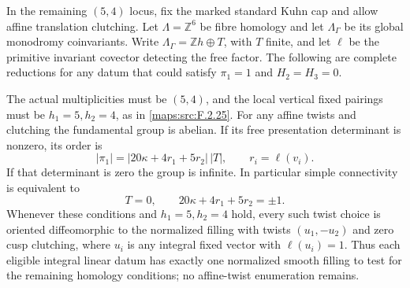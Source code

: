 



\begin{theorem}\label{maps:src:F.2.28}


In the remaining $(5,4)$ locus, fix the marked standard Kuhn
cap and allow affine translation clutching.
Let $\Lambda=\mathbb Z^6$ be fibre homology and let
$\Lambda_\Gamma$ be its global monodromy coinvariants.
Write $\Lambda_\Gamma=\mathbb Zh\oplus T$, with $T$ finite,
and let $\ell$ be the primitive invariant covector detecting
the free factor.  The following are complete reductions for
any datum that could satisfy $\pi_1=1$ and $H_2=H_3=0$.

The actual multiplicities must be $(5,4)$, and the local
vertical fixed pairings must be $h_1=5,h_2=4$, as in \ref{maps:src:F.2.25}.
For any affine twists and clutching the fundamental group
is abelian.  If its free presentation determinant is nonzero,
its order is
\[
 |\pi_1|=|20\kappa+4r_1+5r_2|\,|T|,
 \qquad r_i=\ell(v_i).
 \tag{F.T11}\label{maps:eq:F.T11}
\]
If that determinant is zero the group is infinite.
In particular simple connectivity is equivalent to
\[
 T=0,\qquad 20\kappa+4r_1+5r_2=\pm1.
 \tag{F.T12}\label{maps:eq:F.T12}
\]
Whenever these conditions and $h_1=5,h_2=4$ hold, every
such twist choice is oriented diffeomorphic to the normalized
filling with twists $(u_1,-u_2)$ and zero cusp clutching,
where $u_i$ is any integral fixed vector with $\ell(u_i)=1$.
Thus each eligible integral linear datum has exactly one
normalized smooth filling to test for the remaining
homology conditions; no affine-twist enumeration remains.

\end{theorem}


